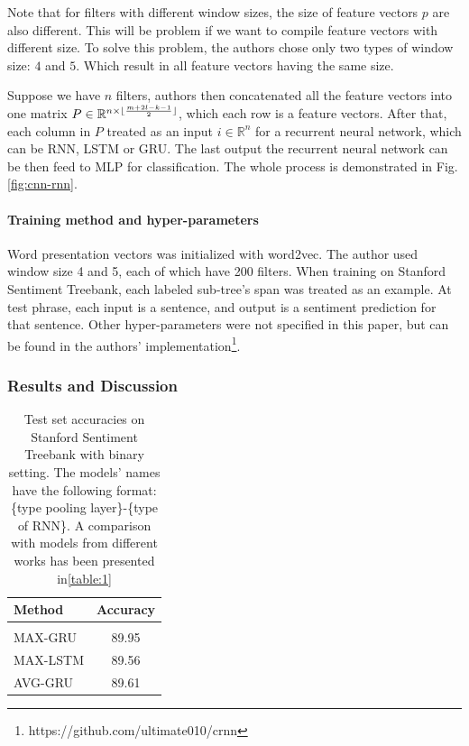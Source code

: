 Note that for filters with different window sizes, the size of feature vectors \(p\) are also different. 
This will be problem if we want to compile feature vectors with different size.
To solve this problem, the authors chose only two types of window size: \(4\) and \(5\).
Which result in all feature vectors having the same size. 

Suppose we have \(n\) filters, authors then concatenated all the feature vectors into one matrix \(P \in \mathbb{R}^{n \times \lfloor \frac{m + 2l - k - 1}{2} \rfloor}\), which each row is a feature vectors. 
After that, each column in \(P\) treated as an input \(i \in \mathbb{R}^{n}\) for a recurrent neural network, which can be RNN, LSTM or GRU.
The last output the recurrent neural network can be then feed to MLP for classification.
The whole process is demonstrated in Fig.\ref{fig:cnn-rnn}.

\paragraph{Training method and hyper-parameters} 
Word presentation vectors was initialized with word2vec\cite{word2vec}.
The author used window size 4 and 5, each of which have 200 filters. 
When training on Stanford Sentiment Treebank, each labeled sub-tree's span was treated as an example.
At test phrase, each input is a sentence, and output is a sentiment prediction for that sentence.
Other hyper-parameters were not specified in this paper, but can be found in the authors' implementation\footnote{https://github.com/ultimate010/crnn}.

\subsubsection{Results and Discussion}
\begin{table}[H]
\centering
\begin{tabular}{l c} 
 \hline
 \hline 
 Method & Accuracy \\ [0.5ex] 
 \hline
 \hline
 \\  
 MAX-GRU & 89.95 \\ 
 MAX-LSTM & 89.56 \\ 
 AVG-GRU & 89.61 \\ 
 \hline
 \hline
\end{tabular}
\caption{Test set accuracies on Stanford Sentiment Treebank with binary setting. 
The models' names have the following format: \{type pooling layer\}-\{type of RNN\}.
A comparison with models from different works has been presented in\ref{table:1}}
\label{table:cnn-rnn}
\end{table}

